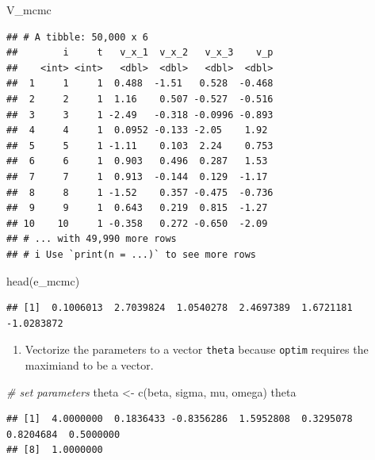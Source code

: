 \documentclass[
]{book}
\newenvironment{Shaded}{\begin{snugshade}}{\end{snugshade}}
\newcommand{\CommentTok}[1]{\textcolor[rgb]{0.56,0.35,0.01}{\textit{#1}}}
\newcommand{\FunctionTok}[1]{\textcolor[rgb]{0.00,0.00,0.00}{#1}}
\newcommand{\NormalTok}[1]{#1}
\newcommand{\OtherTok}[1]{\textcolor[rgb]{0.56,0.35,0.01}{#1}}
\providecommand{\tightlist}{%
  \setlength{\itemsep}{0pt}\setlength{\parskip}{0pt}}
\begin{document}
\begin{Shaded}
\begin{Highlighting}[]
\NormalTok{V\_mcmc}
\end{Highlighting}
\end{Shaded}

\begin{verbatim}
## # A tibble: 50,000 x 6
##        i     t   v_x_1  v_x_2   v_x_3    v_p
##    <int> <int>   <dbl>  <dbl>   <dbl>  <dbl>
##  1     1     1  0.488  -1.51   0.528  -0.468
##  2     2     1  1.16    0.507 -0.527  -0.516
##  3     3     1 -2.49   -0.318 -0.0996 -0.893
##  4     4     1  0.0952 -0.133 -2.05    1.92 
##  5     5     1 -1.11    0.103  2.24    0.753
##  6     6     1  0.903   0.496  0.287   1.53 
##  7     7     1  0.913  -0.144  0.129  -1.17 
##  8     8     1 -1.52    0.357 -0.475  -0.736
##  9     9     1  0.643   0.219  0.815  -1.27 
## 10    10     1 -0.358   0.272 -0.650  -2.09 
## # ... with 49,990 more rows
## # i Use `print(n = ...)` to see more rows
\end{verbatim}

\begin{Shaded}
\begin{Highlighting}[]
\FunctionTok{head}\NormalTok{(e\_mcmc)}
\end{Highlighting}
\end{Shaded}

\begin{verbatim}
## [1]  0.1006013  2.7039824  1.0540278  2.4697389  1.6721181 -1.0283872
\end{verbatim}

\begin{enumerate}
\def\labelenumi{\arabic{enumi}.}
\setcounter{enumi}{1}
\tightlist
\item
  Vectorize the parameters to a vector \texttt{theta} because \texttt{optim} requires the maximiand to be a vector.
\end{enumerate}

\begin{Shaded}
\begin{Highlighting}[]
\CommentTok{\# set parameters}
\NormalTok{theta }\OtherTok{\textless{}{-}} \FunctionTok{c}\NormalTok{(beta, sigma, mu, omega)}
\NormalTok{theta}
\end{Highlighting}
\end{Shaded}

\begin{verbatim}
## [1]  4.0000000  0.1836433 -0.8356286  1.5952808  0.3295078  0.8204684  0.5000000
## [8]  1.0000000
\end{verbatim}
\end{document}
